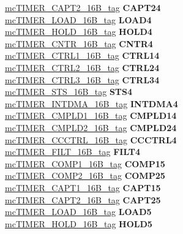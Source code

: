\begin{DoxyCompactItemize}
\begin{tabbing}
\>\>\mbox{\hyperlink{unionmcTIMER__CAPT2__16B__tag}{mcTIMER\_CAPT2\_16B\_tag}} {\bfseries CAPT24}\\
\>\>\mbox{\hyperlink{unionmcTIMER__LOAD__16B__tag}{mcTIMER\_LOAD\_16B\_tag}} {\bfseries LOAD4}\\
\>\>\mbox{\hyperlink{unionmcTIMER__HOLD__16B__tag}{mcTIMER\_HOLD\_16B\_tag}} {\bfseries HOLD4}\\
\>\>\mbox{\hyperlink{unionmcTIMER__CNTR__16B__tag}{mcTIMER\_CNTR\_16B\_tag}} {\bfseries CNTR4}\\
\>\>\mbox{\hyperlink{unionmcTIMER__CTRL1__16B__tag}{mcTIMER\_CTRL1\_16B\_tag}} {\bfseries CTRL14}\\
\>\>\mbox{\hyperlink{unionmcTIMER__CTRL2__16B__tag}{mcTIMER\_CTRL2\_16B\_tag}} {\bfseries CTRL24}\\
\>\>\mbox{\hyperlink{unionmcTIMER__CTRL3__16B__tag}{mcTIMER\_CTRL3\_16B\_tag}} {\bfseries CTRL34}\\
\>\>\mbox{\hyperlink{unionmcTIMER__STS__16B__tag}{mcTIMER\_STS\_16B\_tag}} {\bfseries STS4}\\
\>\>\mbox{\hyperlink{unionmcTIMER__INTDMA__16B__tag}{mcTIMER\_INTDMA\_16B\_tag}} {\bfseries INTDMA4}\\
\>\>\mbox{\hyperlink{unionmcTIMER__CMPLD1__16B__tag}{mcTIMER\_CMPLD1\_16B\_tag}} {\bfseries CMPLD14}\\
\>\>\mbox{\hyperlink{unionmcTIMER__CMPLD2__16B__tag}{mcTIMER\_CMPLD2\_16B\_tag}} {\bfseries CMPLD24}\\
\>\>\mbox{\hyperlink{unionmcTIMER__CCCTRL__16B__tag}{mcTIMER\_CCCTRL\_16B\_tag}} {\bfseries CCCTRL4}\\
\>\>\mbox{\hyperlink{unionmcTIMER__FILT__16B__tag}{mcTIMER\_FILT\_16B\_tag}} {\bfseries FILT4}\\
\>\>\mbox{\hyperlink{unionmcTIMER__COMP1__16B__tag}{mcTIMER\_COMP1\_16B\_tag}} {\bfseries COMP15}\\
\>\>\mbox{\hyperlink{unionmcTIMER__COMP2__16B__tag}{mcTIMER\_COMP2\_16B\_tag}} {\bfseries COMP25}\\
\>\>\mbox{\hyperlink{unionmcTIMER__CAPT1__16B__tag}{mcTIMER\_CAPT1\_16B\_tag}} {\bfseries CAPT15}\\
\>\>\mbox{\hyperlink{unionmcTIMER__CAPT2__16B__tag}{mcTIMER\_CAPT2\_16B\_tag}} {\bfseries CAPT25}\\
\>\>\mbox{\hyperlink{unionmcTIMER__LOAD__16B__tag}{mcTIMER\_LOAD\_16B\_tag}} {\bfseries LOAD5}\\
\>\>\mbox{\hyperlink{unionmcTIMER__HOLD__16B__tag}{mcTIMER\_HOLD\_16B\_tag}} {\bfseries HOLD5}\\

\end{tabbing}
\end{DoxyCompactItemize}
